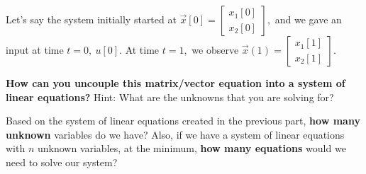 \begin{enumerate}
  \qitem Let's say the system initially started at $\vec{x}[0] = \begin{bmatrix} x_{1}[0] \\ x_{2}[0] \end{bmatrix},$ and we gave an input at time $t = 0, \ u[0].$ 
  At time $t = 1,$ we observe $\vec{x}(1) = \begin{bmatrix} x_{1}[1] \\ x_{2}[1] \end{bmatrix}.$
  
  \textbf{How can you uncouple this matrix/vector equation into a system of linear equations?}
  Hint: What are the unknowns that you are solving for?

  \ws {
    \vspace{75px}
  }


  \qitem Based on the system of linear equations created in the previous part, \textbf{how many unknown} variables do we have? Also, if we have a system of linear equations with $n$ unknown variables, at the minimum, \textbf{how many equations} would we need to solve our system?


\end{enumerate}
